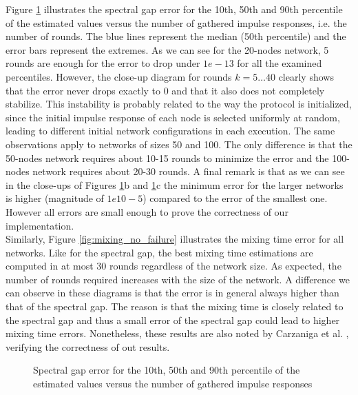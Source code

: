 \documentclass[a4paper,11pt,twoside]{report}
\begin{document}
Figure \ref{fig:spectral_no_failure} illustrates the spectral gap error for the 10th, 50th and 90th percentile of the estimated values versus the number of gathered impulse responses, i.e. the number of rounds. The blue lines represent the median (50th percentile) and the error bars represent the extremes. As we can see for the 20-nodes network, 5 rounds are enough for the error to drop under $1e-13$ for all the examined percentiles. However, the close-up diagram for rounds $k=5\dots40$ clearly shows that the error never drops exactly to 0 and that it also does not completely stabilize. This instability is probably related to the way the protocol is initialized, since the initial impulse response of each node is selected uniformly at random, leading to different initial network configurations in each execution. The same observations apply to networks of sizes 50 and 100. The only difference is that the 50-nodes network requires about 10-15 rounds to minimize the error and the 100-nodes network requires about 20-30 rounds. A final remark is that as we can see in the close-ups of Figures \ref{fig:spectral_no_failure}b and \ref{fig:spectral_no_failure}c the minimum error for the larger networks is higher (magnitude of $1e10-5 $) compared to the error of the smallest one. However all errors are small enough to prove the correctness of our implementation. \\

Similarly, Figure \ref{fig:mixing_no_failure} illustrates the mixing time error for all networks. Like for the spectral gap, the best mixing time estimations are computed in at most 30 rounds regardless of the network size. As expected, the number of rounds required increases with the size of the network. A difference we can observe in these diagrams is that the error is in general always higher than that of the spectral gap. The reason is that the mixing time is closely related to the spectral gap and thus a small error of the spectral gap could lead to higher mixing time errors. Nonetheless, these results are also noted by Carzaniga et al. \cite{6195806}, verifying the correctness of out results.


\begin{figure}
\centering
{}
\qquad
{}
\qquad
{}

\caption{Spectral gap error for the 10th, 50th and 90th percentile of the estimated values versus the number of gathered impulse responses}
\label{fig:spectral_no_failure}
\end{figure}
\end{document}

